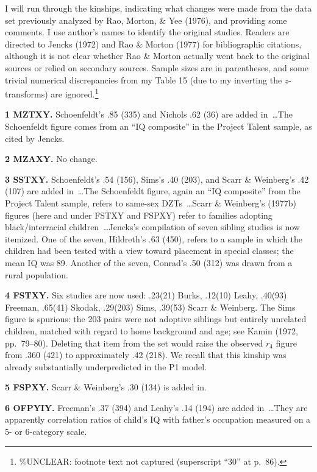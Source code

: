 ﻿\documentclass[12pt]{article}
\begin{document}
I will run through the kinships, indicating what changes were made from the data set previously analyzed by Rao, Morton, \& Yee (1976), and providing some comments. I use author's names to identify the original studies. Readers are directed to Jencks (1972) and Rao \& Morton (1977) for bibliographic citations, although it is not clear whether Rao \& Morton actually went back to the original sources or relied on secondary sources. Sample sizes are in parentheses, and some trivial numerical discrepancies from my Table 15 (due to my inverting the $z$-transforms) are ignored.\footnote{\%UNCLEAR: footnote text not captured (superscript ``30'' at p.\ 86).}

\textbf{1 MZTXY.} Schoenfeldt's .85 (335) and Nichols .62 (36) are added in~\ldots The Schoenfeldt figure comes from an ``IQ composite'' in the Project Talent sample, as cited by Jencks.

\textbf{2 MZAXY.} No change.

\textbf{3 SSTXY.} Schoenfeldt's .54 (156), Sims's .40 (203), and Scarr \& Weinberg's .42 (107) are added in~\ldots The Schoenfeldt figure, again an ``IQ composite'' from the Project Talent sample, refers to same-sex DZTs~\ldots Scarr \& Weinberg's (1977b) figures (here and under FSTXY and FSPXY) refer to families adopting black/interracial children~\ldots Jencks's compilation of seven sibling studies is now itemized. One of the seven, Hildreth's .63 (450), refers to a sample in which the children had been tested with a view toward placement in special classes; the mean IQ was 89. Another of the seven, Conrad's .50 (312) was drawn from a rural population.

\textbf{4 FSTXY.} Six studies are now used: .23(21) Burks, .12(10) Leahy, .40(93) Freeman, .65(41) Skodak, .29(203) Sims, .39(53) Scarr \& Weinberg. The Sims figure is spurious: the 203 pairs were not adoptive siblings but entirely unrelated children, matched with regard to home background and age; see Kamin (1972, pp.\ 79--80). Deleting that item from the set would raise the observed $r_4$ figure from .360 (421) to approximately .42 (218). We recall that this kinship was already substantially underpredicted in the P1 model.

\textbf{5 FSPXY.} Scarr \& Weinberg's .30 (134) is added in.

\textbf{6 OFPYIY.} Freeman's .37 (394) and Leahy's .14 (194) are added in~\ldots They are apparently correlation ratios of child's IQ with father's occupation measured on a 5- or 6-category scale.
\end{document}

